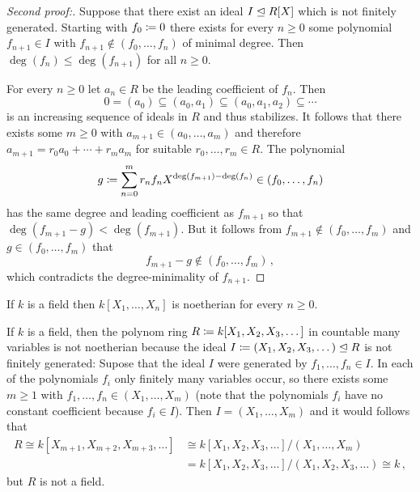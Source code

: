 \begin{proof}[Second proof:]
  Suppose that there exist an ideal $I \trianglelefteq R[X]$ which is not finitely generated.
  Starting with $f_0 \coloneqq 0$ there exists for every $n \geq 0$ some polynomial $f_{n+1} \in I$ with $f_{n+1} \notin (f_0, \dotsc, f_n)$ of minimal degree.
  Then $\deg(f_n) \leq \deg(f_{n+1})$ for all $n \geq 0$.
  
  For every $n \geq 0$ let $a_n \in R$ be the leading coefficient of $f_n$.
  Then
  \[
              0
    =         (a_0)
    \subseteq (a_0, a_1)
    \subseteq (a_0, a_1, a_2)
    \subseteq \dotsb
  \]
  is an increasing sequence of ideals in $R$ and thus stabilizes.
  It follows that there exists some $m \geq 0$ with $a_{m+1} \in (a_0, \dotsc, a_m)$ and therefore $a_{m+1} = r_0 a_0 + \dotsb + r_m a_m$ for suitable $r_0, \dotsc, r_m \in R$.
  The polynomial
  \[
              g
    \coloneqq  \sum_{n=0}^m r_n f_n X^{\deg(f_{m+1}) - \deg(f_n)}
    \in       (f_0, \dotsc, f_n)
  \]
  has the same degree and leading coefficient as $f_{m+1}$ so that $\deg(f_{m+1} - g) < \deg(f_{m+1})$.
  But it follows from $f_{m+1} \notin (f_0, \dotsc, f_m)$ and $g \in (f_0, \dotsc, f_m)$ that
  \[
            f_{m+1} - g
    \notin  (f_0, \dotsc, f_m) \,,
  \]
  which contradicts the degree-minimality of $f_{n+1}$.
\end{proof}


\begin{example}
  If $k$ is a field then $k[X_1, \dotsc, X_n]$ is noetherian for every $n \geq 0$.
\end{example}


\begin{example}
  If $k$ is a field, then the polynom ring $R \coloneqq k[X_1, X_2, X_3, \dotsc]$ in countable many variables is not noetherian because the ideal $I \coloneqq (X_1, X_2, X_3, \dotsc) \trianglelefteq R$ is not finitely generated:
  Supose that the ideal $I$ were generated by $f_1, \dotsc, f_n \in I$.
  In each of the polynomials $f_i$ only finitely many variables occur, so there exists some $m \geq 1$ with $f_1, \dotsc, f_n \in (X_1, \dotsc, X_m)$ (note that the polynomials $f_i$ have no constant coefficient because $f_i \in I$).
  Then $I = (X_1, \dotsc, X_m)$ and it would follows that
  \begin{align*}
            R
     \cong  k[X_{m+1}, X_{m+2}, X_{m+3}, \dotsc]
    &\cong  k[X_1, X_2, X_3, \dotsc]/(X_1, \dotsc, X_m)  \\
    &=      k[X_1, X_2, X_3, \dotsc]/(X_1, X_2, X_3, \dotsc)
     \cong  k \,,
  \end{align*}
  but $R$ is not a field.
\end{example}


